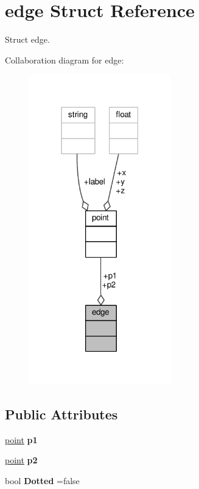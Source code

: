 \hypertarget{structedge}{}\section{edge Struct Reference}
\label{structedge}


Struct edge.  




Collaboration diagram for edge\+:\nopagebreak
\begin{figure}[H]
\begin{center}
\leavevmode
\includegraphics[width=174pt]{structedge__coll__graph}
\end{center}
\end{figure}
\subsection*{Public Attributes}
\begin{DoxyCompactItemize}
\item 
\hyperlink{structpoint}{point} {\bfseries p1}\hypertarget{structedge_a7b074374ee3059d29a93e9e76480274e}{}\label{structedge_a7b074374ee3059d29a93e9e76480274e}

\item 
\hyperlink{structpoint}{point} {\bfseries p2}\hypertarget{structedge_a105ba74e7b01aba7e0e113ab286dc883}{}\label{structedge_a105ba74e7b01aba7e0e113ab286dc883}

\item 
bool {\bfseries Dotted} =false\hypertarget{structedge_ae35774472063d8f38a1ce7b375b39921}{}\label{structedge_ae35774472063d8f38a1ce7b375b39921}

\end{DoxyCompactItemize}


